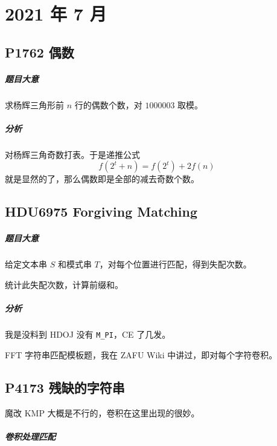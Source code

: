 \chapter{2021 年 7 月}

\section{P1762 偶数}

\paragraph{题目大意}

求杨辉三角形前 $n$ 行的偶数个数，对 $1000003$ 取模。

\paragraph{分析}

对杨辉三角奇数打表。于是递推公式
\[ f(2^t+n) = f(2^t) + 2f(n) \]
就是显然的了，那么偶数即是全部的减去奇数个数。

\section{HDU6975 Forgiving Matching}

\paragraph{题目大意}

给定文本串 $S$ 和模式串 $T$，对每个位置进行匹配，得到失配次数。

统计此失配次数，计算前缀和。

\paragraph{分析}

我是没料到 HDOJ 没有 \verb`M_PI`，CE 了几发。

FFT 字符串匹配模板题，我在 ZAFU Wiki 中讲过，即对每个字符卷积。

\section{P4173 残缺的字符串}

魔改 KMP 大概是不行的，卷积在这里出现的很妙。

\paragraph{卷积处理匹配}


